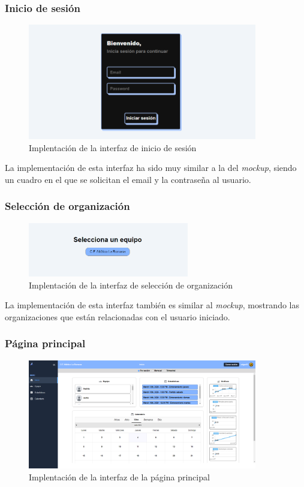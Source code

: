 \subsubsection{Inicio de sesión}
\begin{figure}[H]
    \centering
    \includegraphics[width=10cm]{archivos/tfg_jorge/interfaces/login}
    \caption{Implentación de la interfaz de inicio de sesión}\label{sistemass2}
\end{figure}

La implementación de esta interfaz ha sido muy similar a la del \textit{mockup}, siendo un cuadro en el que se solicitan el email y la contraseña al usuario.
\subsubsection{Selección de organización}
\begin{figure}[H]
    \centering
    \includegraphics[width=7cm]{archivos/tfg_jorge/interfaces/seleccion_equipo}
    \caption{Implentación de la interfaz de selección de organización}\label{sistemass2}
\end{figure}

La implementación de esta interfaz también es similar al \textit{mockup}, mostrando las organizaciones que están relacionadas con el usuario iniciado.
\subsubsection{Página principal}
\begin{figure}[H]
    \centering
    \includegraphics[width=10cm]{archivos/tfg_jorge/interfaces/home}
    \caption{Implentación de la interfaz de la página principal}\label{sistemass2}
\end{figure}

